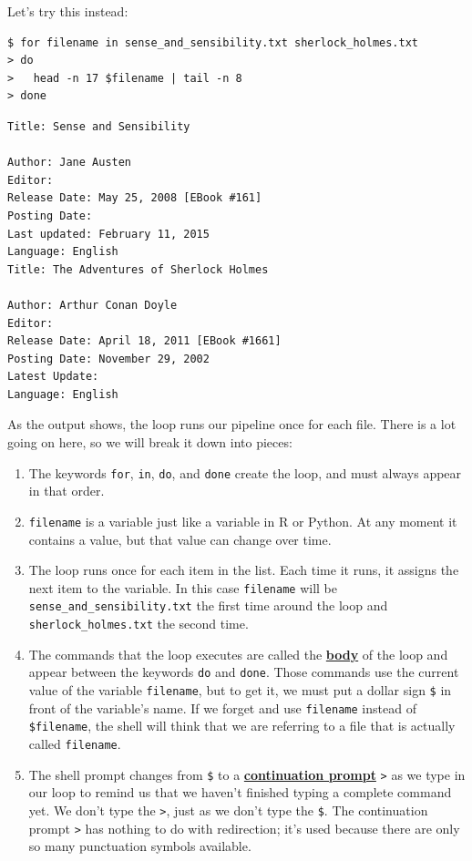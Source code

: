 \documentclass[
]{krantz}
\newcommand{\gref}[2]{\hyperlink{#2}{\textbf{#1}}}
\begin{document}
Let's try this instead:

\begin{verbatim}
$ for filename in sense_and_sensibility.txt sherlock_holmes.txt
> do
>   head -n 17 $filename | tail -n 8
> done
\end{verbatim}

\begin{verbatim}
Title: Sense and Sensibility

Author: Jane Austen
Editor:
Release Date: May 25, 2008 [EBook #161]
Posting Date:
Last updated: February 11, 2015
Language: English
Title: The Adventures of Sherlock Holmes

Author: Arthur Conan Doyle
Editor:
Release Date: April 18, 2011 [EBook #1661]
Posting Date: November 29, 2002
Latest Update:
Language: English
\end{verbatim}

As the output shows,
the loop runs our pipeline once for each file.
There is a lot going on here,
so we will break it down into pieces:

\begin{enumerate}
\def\labelenumi{\arabic{enumi}.}
\item
  The keywords \texttt{for}, \texttt{in}, \texttt{do}, and \texttt{done} create the loop,
  and must always appear in that order.
\item
  \texttt{filename} is a variable just like a variable in R or Python.
  At any moment it contains a value,
  but that value can change over time.
\item
  The loop runs once for each item in the list.
  Each time it runs,
  it assigns the next item to the variable.
  In this case \texttt{filename} will be \texttt{sense\_and\_sensibility.txt}
  the first time around the loop
  and \texttt{sherlock\_holmes.txt} the second time.
\item
  The commands that the loop executes are called the \gref{body}{loop\_body} of the loop
  and appear between the keywords \texttt{do} and \texttt{done}.
  Those commands use the current value of the variable \texttt{filename},
  but to get it,
  we must put a dollar sign \texttt{\$} in front of the variable's name.
  If we forget and use \texttt{filename} instead of \texttt{\$filename},
  the shell will think that we are referring to a file
  that is actually called \texttt{filename}.
\item
  The shell prompt changes from \texttt{\$}
  to a \gref{continuation prompt}{continuation\_prompt} \texttt{\textgreater{}}
  as we type in our loop
  to remind us that we haven't finished typing a complete command yet.
  We don't type the \texttt{\textgreater{}},
  just as we don't type the \texttt{\$}.
  The continuation prompt \texttt{\textgreater{}} has nothing to do with redirection;
  it's used because there are only so many punctuation symbols available.
\end{enumerate}
\end{document}
